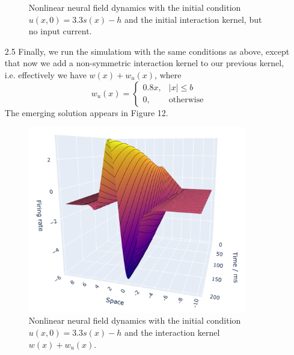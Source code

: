 \documentclass[12pt]{article}
\begin{document}
\begin{enumerate}
\begin{figure}[H]
    \caption{Nonlinear neural field dynamics with the initial condition $u(x, 0)=3.3s(x)-h$ and the initial interaction kernel, but no input current.}
\end{figure}
\item[2.5] Finally, we run the simulatiom with the same conditions as above, except that now we add a non-symmetric interaction kernel to our previous kernel, i.e.
effectively we have $w(x)+w_{u}(x)$, where
\[
    w_{u}(x)=\begin{cases}
        0.8x, & |x| \leq b\\
        0, & \text{otherwise}
    \end{cases} 
\] 
The emerging solution appears in Figure 12.
\begin{figure}[H]
    \centering
    \includegraphics[width=0.9\textwidth]{./figure12.png}
    \caption{Nonlinear neural field dynamics with the initial condition $u(x, 0)=3.3s(x)-h$ and the interaction kernel $w(x)+w_{u}(x)$.}
\end{figure}
\end{enumerate}
\end{document}
